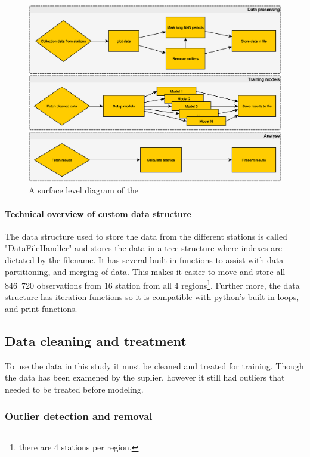 \begin{figure}
	\centering
	\includegraphics[width=0.7\linewidth]{figures/progress_diagram}
	\caption[Diagram sketching three procedures used in this study.]{A surface level diagram of the }
	\label{fig:progressdiagram}
\end{figure}


\paragraph[Data structure]{Technical overview of custom data structure}
The data structure used to store the data from the different stations is called "DataFileHandler" and stores the data in a tree-structure where indexes are dictated by the filename. It has several built-in functions to assist with data partitioning, and merging of data. This makes it easier to move and store all 846 720 observations from 16 station from all 4 regions\footnote{there are 4 stations per region.}. Further more, the data structure has iteration functions so it is compatible with python's built in loops, and print functions. 

\subsection{Data cleaning and treatment}

To use the data in this study it must be cleaned and treated for training. Though the data has been examened by the suplier, however it still had outliers that needed to be treated before modeling. 

\subsubsection{Outlier detection and removal}

